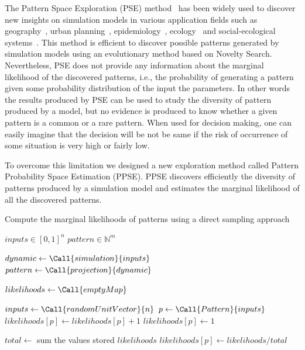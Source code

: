 \documentclass[10pt,letterpaper]{article}
\theoremstyle{definition}
\theoremstyle{remark}
\begin{document}
The Pattern Space Exploration (PSE) method~\cite{cherel2015} has been widely used to discover new insights on simulation models in various application fields such as geography~\cite{cottineau2015modular, raimbault2021modeling}, urban planning~\cite{brasebin20183d}, epidemiology~\cite{edali2020analysis}, ecology~\cite{widyastuti2022assessing} and social-ecological systems~\cite{jahel2023future}. This method is efficient to discover possible patterns generated by simulation models using an evolutionary method based on Novelty Search.
Nevertheless, PSE does not provide any information about the marginal likelihood of the discovered patterns, i.e., the probability of generating a pattern given some probability distribution of the input the parameters. In other words the results produced by PSE can be used to study the diversity of pattern produced by a model, but no evidence is produced to know whether a given pattern is a common or a rare pattern. When used for decision making, one can easily imagine that the decision will be not be same if the risk of occurrence of some situation is very high or fairly low.

To overcome this limitation we designed a new exploration method called Pattern Probability Space Estimation (PPSE). PPSE discovers efficiently the diversity of patterns produced by a simulation model and estimates the marginal likelihood of all the discovered patterns.

\begin{algorithm}
    \caption{Compute the marginal likelihoods of patterns using a direct sampling approach}
    \label{algo:directsampling}
    \begin{algorithmic}[1]
        \Require $inputs \in [0, 1]^n$
        \Ensure $pattern \in \mathbb{N}^m$
        \Statex
        
            \State $dynamic \gets \Call{simulation}{inputs}$
            \State $pattern \gets \Call{projection}{dynamic}$ 
            \State {}
        \EndFunction

        \Statex
        \State $likelihoods \gets \Call{emptyMap}$

            \State $inputs \gets \Call{randomUnitVector}{n}$
            \State $p \gets \Call{Pattern}{inputs}$
            \State $likelihoods[p] \gets likelihoods[p] + 1$
            \Else 
            \State $likelihoods[p] \gets 1$
            \EndIf
        \EndFor

        \Statex
        \State $total \gets$ sum the values stored $likelihoods$
           \State $likelihoods[p] \gets likelihoods / total$
        \EndFor
        
    \end{algorithmic}
\end{algorithm}
\end{document}
